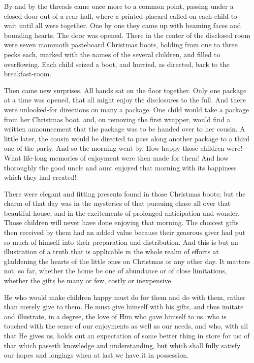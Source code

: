 \documentclass[
]{book}
\begin{document}
By and by the threads came once more to a common point, passing under a closed door out of a rear hall, where a printed placard called on each child to wait until all were together. One by one they came up with beaming faces and bounding hearts. The door was opened. There in the center of the disclosed room were seven mammoth pasteboard Christmas boots, holding from one to three pecks each, marked with the names of the several children, and filled to overflowing. Each child seized a boot, and hurried, as directed, back to the breakfast-room.

Then came new surprises. All hands sat on the floor together. Only one package at a time was opened, that all might enjoy the disclosures to the full. And there were unlooked-for directions on many a package. One child would take a package from her Christmas boot, and, on removing the first wrapper, would find a written announcement that the package was to be handed over to her cousin. A little later, the cousin would be directed to pass along another package to a third one of the party. And so the morning went by. How happy those children were! What life-long memories of enjoyment were then made for them! And how thoroughly the good uncle and aunt enjoyed that morning with its happiness which they had created!

There were elegant and fitting presents found in those Christmas boots; but the charm of that day was in the mysteries of that pursuing chase all over that beautiful house, and in the excitements of prolonged anticipation and wonder. Those children will never have done enjoying that morning. The choicest gifts then received by them had an added value because their generous giver had put so much of himself into their preparation and distribution. And this is but an illustration of a truth that is applicable in the whole realm of efforts at gladdening the hearts of the little ones on Christmas or any other day. It matters not, so far, whether the home be one of abundance or of close limitations, whether the gifts be many or few, costly or inexpensive.

He who would make children happy must do for them and do with them, rather than merely give to them. He must give himself with his gifts, and thus imitate and illustrate, in a degree, the love of Him who gave himself to us, who is touched with the sense of our enjoyments as well as our needs, and who, with all that He gives us, holds out an expectation of some better thing in store for us: of that which passeth knowledge and understanding, but which shall fully satisfy our hopes and longings when at last we have it in possession.
\end{document}
